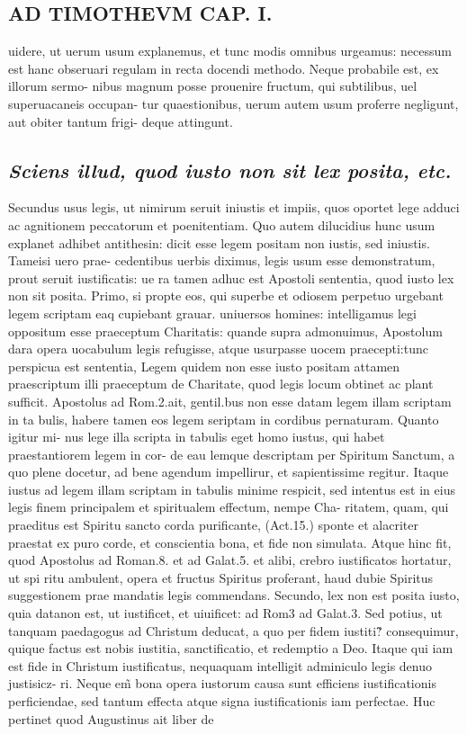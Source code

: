 \documentclass{article}
\begin{document}
\begin{pages}
\section*{AD TIMOTHEVM CAP. I. }
\marginpar{[ p.26 ]}\pstart uidere, ut uerum usum explanemus, et tunc modis omnibus urgeamus: necessum est hanc obseruari regulam in recta docendi methodo. Neque  probabile est, ex illorum sermo- nibus magnum posse prouenire fructum, qui subtilibus, uel superuacaneis occupan- tur quaestionibus, uerum autem usum proferre negligunt, aut obiter tantum frigi- deque  attingunt.  \pend
{}
{}
\subsection*{\textit{Sciens illud, quod iusto non sit lex posita, etc. }}\pstart Secundus usus legis, ut nimirum seruit iniustis et impiis, quos oportet lege adduci ac agnitionem peccatorum et poenitentiam. Quo autem dilucidius hunc usum explanet adhibet antithesin: dicit esse legem positam non iustis, sed iniustis. Tameisi uero prae- cedentibus uerbis diximus, legis usum esse demonstratum, prout seruit iustificatis: ue ra tamen adhuc est Apostoli sententia, quod iusto lex non sit posita. Primo, si propte eos, qui superbe et odiosem perpetuo urgebant legem scriptam eaq cupiebant grauar. uniuersos homines: intelligamus legi oppositum esse praeceptum Charitatis: quande supra admonuimus, Apostolum dara opera uocabulum legis refugisse, atque  usurpasse uocem praecepti:tunc perspicua est sententia, Legem quidem non esse iusto positam attamen praescriptum illi praeceptum de Charitate, quod legis locum obtinet ac plant sufficit. Apostolus ad Rom.2.ait, gentil.bus non esse datam legem illam scriptam in ta bulis, habere tamen eos legem seriptam in cordibus pernaturam. Quanto igitur mi- nus lege illa scripta in tabulis eget homo iustus, qui habet praestantiorem legem in cor- de eau lemque  descriptam per Spiritum Sanctum, a quo plene docetur, ad bene agendum impellirur, et sapientissime regitur. Itaque  iustus ad legem illam scriptam in tabulis minime respicit, sed intentus est in eius legis finem principalem et spiritualem effectum, nempe Cha- ritatem, quam, qui praeditus est Spiritu sancto corda purificante, (Act.15.) sponte et alacriter praestat ex puro corde, et conscientia bona, et fide non simulata. Atque  hinc fit, quod Apostolus ad Roman.8. et ad Galat.5. et alibi, crebro iustificatos hortatur, ut spi ritu ambulent, opera et fructus Spiritus proferant, haud dubie Spiritus suggestionem prae mandatis legis commendans.  \pend\pstart Secundo, lex non est posita iusto, quia datanon est, ut iustificet, et uiuificet: ad Rom3 ad Galat.3. Sed potius, ut tanquam paedagogus ad Christum deducat, a quo per fidem iustiti?̃ consequimur, quique  factus est nobis iustitia, sanctificatio, et redemptio a Deo. Itaque  qui iam est fide in Christum iustificatus, nequaquam intelligit adminiculo legis denuo justisicz- ri. Neque  em̃ bona opera iustorum causa sunt efficiens iustificationis perficiendae, sed tantum effecta atque  signa iustificationis iam perfectae. Huc pertinet quod Augustinus ait liber  de 
\end{pages}
\end{document}
